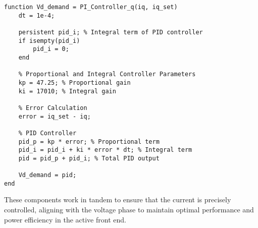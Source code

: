 \begin{lstlisting}[style=MATLAB, caption={PI Controller}, label={lst:picontroller}]
function Vd_demand = PI_Controller_q(iq, iq_set)
    dt = 1e-4;
    
    persistent pid_i; % Integral term of PID controller
    if isempty(pid_i)
        pid_i = 0;
    end
    
    % Proportional and Integral Controller Parameters
    kp = 47.25; % Proportional gain
    ki = 17010; % Integral gain
    
    % Error Calculation
    error = iq_set - iq;
    
    % PID Controller
    pid_p = kp * error; % Proportional term
    pid_i = pid_i + ki * error * dt; % Integral term
    pid = pid_p + pid_i; % Total PID output
    
    Vd_demand = pid;
end
\end{lstlisting}

These components work in tandem to ensure that the current is precisely
controlled, aligning with the voltage phase to maintain optimal performance and
power efficiency in the active front end.

